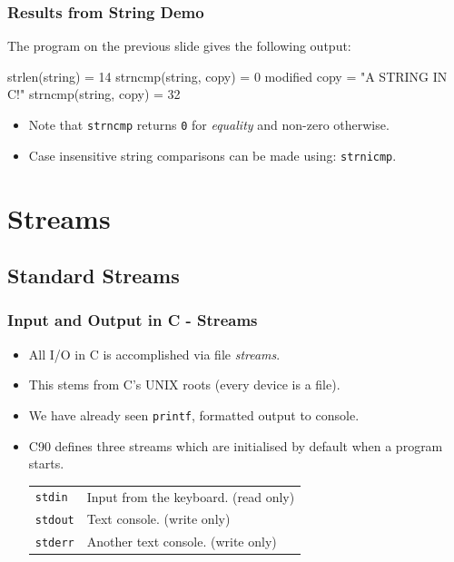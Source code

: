 \documentclass[smaller,handout,table]{beamer}
\begin{document}
\begin{frame}[fragile]
\frametitle{Results from String Demo}
The program on the previous slide gives the following output:
\begin{semiverbatim}
strlen(string) = 14
strncmp(string, copy) = 0
modified copy = "A STRING IN C!"
strncmp(string, copy) = 32
\end{semiverbatim}
\begin{itemize}
\item Note that {\tt strncmp} returns {\tt 0} for \emph{equality} and non-zero otherwise.
\item Case insensitive string comparisons can be made using: {\tt strnicmp}.
\end{itemize}
\end{frame}



\section{Streams}
\subsection{Standard Streams}
\begin{frame}
\frametitle{Input and Output in C - Streams}
\begin{itemize}
\item All I/O in C is accomplished via file \emph{streams}.
\item This stems from C's UNIX roots (every device is a file).
\item We have already seen {\tt printf}, formatted output to console.
\item C90 defines three streams which are initialised by default when a program starts.
\begin{center}
\begin{tabular}{l l}
{\tt stdin}&Input from the keyboard. (read only)\\
{\tt stdout}&Text console. (write only)\\
{\tt stderr}&Another text console. (write only)
\end{tabular}
\end{center}
\end{itemize}
\end{frame}
\end{document}
